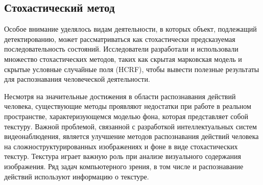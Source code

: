 
\subsection{Стохастический метод}

Особое внимание уделялось видам деятельности, в которых объект, подлежащий детектированию, может рассматриваться как стохастически предсказуемая последовательность состояний.  Исследователи разработали и использовали множество стохастических методов, таких как скрытая марковская модель и скрытые условные случайные поля (HCRF), чтобы вывести полезные результаты для распознавания человеческой деятельности.



Несмотря на значительные достижения в области распознавания действий человека, существующие
методы проявляют недостатки при работе в реальном пространстве, характеризующемся моделью фона, которая представляет собой текстуру. Важной
проблемой, связанной с разработкой интеллектуальных систем видеонаблюдения, является улучшение
методов распознавания действий человека на сложноструктурированных изображениях и фоне в виде
стохастических текстур. Текстура играет важную роль при анализе визуального содержания изображения. Ряд задач компьютерного зрения, в том числе и распознавание действий используют информацию о
текстуре.

